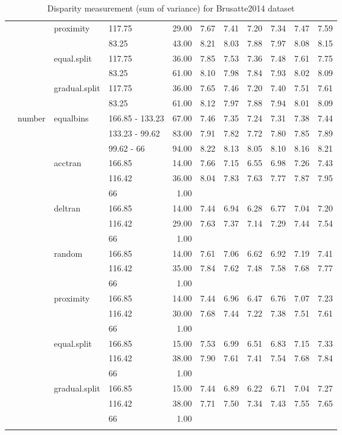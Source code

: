 \begin{longtable}{llllrrrrrrr}
   &  & proximity & 117.75 & 29.00 & 7.67 & 7.41 & 7.20 & 7.34 & 7.47 & 7.59 \\ 
   &  &  & 83.25 & 43.00 & 8.21 & 8.03 & 7.88 & 7.97 & 8.08 & 8.15 \\ 
   &  & equal.split & 117.75 & 36.00 & 7.85 & 7.53 & 7.36 & 7.48 & 7.61 & 7.75 \\ 
   &  &  & 83.25 & 61.00 & 8.10 & 7.98 & 7.84 & 7.93 & 8.02 & 8.09 \\ 
   &  & gradual.split & 117.75 & 36.00 & 7.65 & 7.46 & 7.20 & 7.40 & 7.51 & 7.61 \\ 
   &  &  & 83.25 & 61.00 & 8.12 & 7.97 & 7.88 & 7.94 & 8.01 & 8.09 \\ 
   & number & equalbins & 166.85 - 133.23 & 67.00 & 7.46 & 7.35 & 7.24 & 7.31 & 7.38 & 7.44 \\ 
   &  &  & 133.23 - 99.62 & 83.00 & 7.91 & 7.82 & 7.72 & 7.80 & 7.85 & 7.89 \\ 
   &  &  & 99.62 - 66 & 94.00 & 8.22 & 8.13 & 8.05 & 8.10 & 8.16 & 8.21 \\ 
   &  & acctran & 166.85 & 14.00 & 7.66 & 7.15 & 6.55 & 6.98 & 7.26 & 7.43 \\ 
   &  &  & 116.42 & 36.00 & 8.04 & 7.83 & 7.63 & 7.77 & 7.87 & 7.95 \\ 
   &  &  & 66 & 1.00 &  &  &  &  &  &  \\ 
   &  & deltran & 166.85 & 14.00 & 7.44 & 6.94 & 6.28 & 6.77 & 7.04 & 7.20 \\ 
   &  &  & 116.42 & 29.00 & 7.63 & 7.37 & 7.14 & 7.29 & 7.44 & 7.54 \\ 
   &  &  & 66 & 1.00 &  &  &  &  &  &  \\ 
   &  & random & 166.85 & 14.00 & 7.61 & 7.06 & 6.62 & 6.92 & 7.19 & 7.41 \\ 
   &  &  & 116.42 & 35.00 & 7.84 & 7.62 & 7.48 & 7.58 & 7.68 & 7.77 \\ 
   &  &  & 66 & 1.00 &  &  &  &  &  &  \\ 
   &  & proximity & 166.85 & 14.00 & 7.44 & 6.96 & 6.47 & 6.76 & 7.07 & 7.23 \\ 
   &  &  & 116.42 & 30.00 & 7.68 & 7.44 & 7.22 & 7.38 & 7.51 & 7.61 \\ 
   &  &  & 66 & 1.00 &  &  &  &  &  &  \\ 
   &  & equal.split & 166.85 & 15.00 & 7.53 & 6.99 & 6.51 & 6.83 & 7.15 & 7.33 \\ 
   &  &  & 116.42 & 38.00 & 7.90 & 7.61 & 7.41 & 7.54 & 7.68 & 7.84 \\ 
   &  &  & 66 & 1.00 &  &  &  &  &  &  \\ 
   &  & gradual.split & 166.85 & 15.00 & 7.44 & 6.89 & 6.22 & 6.71 & 7.04 & 7.27 \\ 
   &  &  & 116.42 & 38.00 & 7.71 & 7.50 & 7.34 & 7.43 & 7.55 & 7.65 \\ 
   &  &  & 66 & 1.00 &  &  &  &  &  &  \\ 
   \hline
\hline
\caption{Disparity measurement (sum of variance) for Brusatte2014 dataset} 
\end{longtable}

